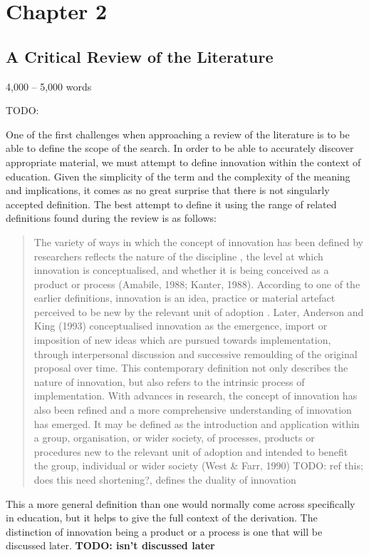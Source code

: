 \section{Chapter 2}
\subsection{A Critical Review of the Literature}
4,000 – 5,000 words

TODO: \cite{Cordingley2007}

One of the first challenges when approaching a review of the literature is to be able to define the scope of the search. In order to be able to accurately discover appropriate material, we must attempt to define innovation within the context of education. Given the simplicity of the term and the complexity of the meaning and implications, it comes as no great surprise that there is not singularly accepted definition. The best attempt to define it using the range of related definitions found during the review is as follows:

\begin{quote}
The variety of ways in which the concept of innovation has been defined by researchers reflects the nature of the discipline \cite{Gopalakrishnan_1994}, the level at which innovation is conceptualised, and whether it is being conceived as a product or process (Amabile, 1988; Kanter, 1988). According to one of the earlier definitions, innovation is an idea, practice or material artefact perceived to be new by the relevant unit of adoption \cite{Allen_1975}. Later, Anderson and King (1993) conceptualised innovation as the emergence, import or imposition of new ideas which are pursued towards implementation, through interpersonal discussion and successive remoulding of the original proposal over time. This contemporary definition not only describes the nature of innovation, but also refers to the intrinsic process of implementation. With advances in research, the concept of innovation has also been refined and a more comprehensive understanding of innovation has emerged. It may be defined as the introduction and application within a group, organisation, or wider society, of processes, products or procedures new to the relevant unit of adoption and intended to benefit the group, individual or wider society (West \& Farr, 1990) TODO: ref this; does this need shortening?, defines the duality of innovation
\end{quote}  \cite{Sharma_2005}

This a more general definition than one would normally come across specifically in education, but it helps to give the full context of the derivation. The distinction of innovation being a product or a process is one that will be discussed later. \textbf{TODO: isn't discussed later}

